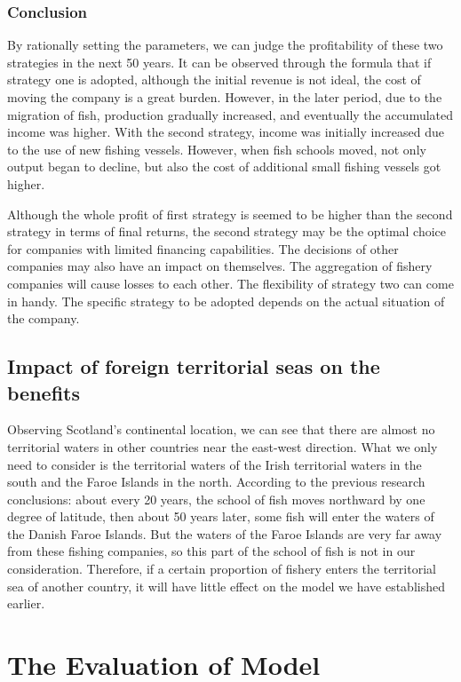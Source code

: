 \documentclass{mcmthesis}
\numberwithin{figure}{section}
\numberwithin{table}{section}
\begin{document}
\subsubsection{Conclusion}
By rationally setting the parameters, we can judge the profitability of these two strategies in the next 50 years. It can be observed through the formula that if strategy one is adopted, although the initial revenue is not ideal, the cost of moving the company is a great burden. However, in the later period, due to the migration of fish, production gradually increased, and eventually the accumulated income was higher. With the second strategy, income was initially increased due to the use of new fishing vessels. However, when fish schools moved, not only output began to decline, but also the cost of additional small fishing vessels got higher.

Although the whole profit of first strategy is seemed to be higher than the second strategy in terms of final returns, the second strategy may be the optimal choice for companies with limited financing capabilities. The decisions of other companies may also have an impact on themselves. The aggregation of fishery companies will cause losses to each other. The flexibility of strategy two can come in handy. The specific strategy to be adopted depends on the actual situation of the company.

\subsection{Impact of foreign territorial seas on the benefits}
Observing Scotland's continental location, we can see that there are almost no territorial waters in other countries near the east-west direction. What we only need to consider is the territorial waters of the Irish territorial waters in the south and the Faroe Islands in the north. According to the previous research conclusions: about every 20 years, the school of fish moves northward by one degree of latitude, then about 50 years later, some fish will enter the waters of the Danish Faroe Islands. But the waters of the Faroe Islands are very far away from these fishing companies, so this part of the school of fish is not in our consideration. Therefore, if a certain proportion of fishery enters the territorial sea of another country, it will have little effect on the model we have established earlier.

\section{The Evaluation of Model}
\end{document}
